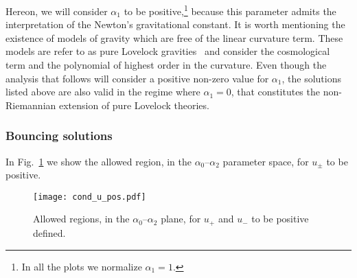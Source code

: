 \documentclass[aps,prd,12pt,superscriptaddress,showpacs,showkeys,longbibliography,reprint,nofootinbib]{revtex4-1}
\begin{document}
Hereon, we will consider $\alpha_1$ to be positive,\footnote{In all the plots we normalize $\alpha_1 = 1$.} because this parameter admits the interpretation of the Newton's gravitational constant. It is worth mentioning the existence of models of gravity which are free of the linear curvature term. These models are refer to as pure Lovelock gravities~\cite{Cai:2006pq} and consider the cosmological term and the polynomial of highest order in the curvature. Even though the analysis that follows will consider a positive non-zero value for $\alpha_1$, the solutions listed above are also valid in the regime where $\alpha_1=0$, that constitutes the non-Riemannian extension of pure Lovelock theories.

\subsubsection{Bouncing solutions}

In Fig.~\ref{cond_u_pos} we show the allowed region, in the $\alpha_0$--$\alpha_2$ parameter space, for $u_\pm$ to be positive. 

\begin{figure}[H]
  \texttt{[image: cond\_u\_pos.pdf]}
  \caption{Allowed regions, in the $\alpha_0$--$\alpha_2$ plane, for $u_+$ and $u_-$ to be positive defined.}
  \label{cond_u_pos}
\end{figure}
\end{document}
